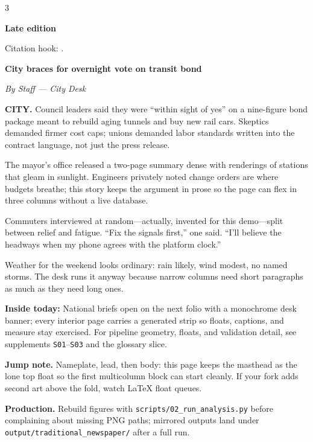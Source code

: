 \documentclass[
]{article}
\begin{document}
\begin{multicols}{3}

\textbf{Late edition}

\noindent Citation hook: \cite{template2026gazette}.
\par\smallskip

\noindent\textbf{\Large City braces for overnight vote on transit bond}\par\smallskip
\textit{By Staff — City Desk}\par\smallskip

\textbf{CITY.} Council leaders said they were ``within sight of yes'' on
a nine-figure bond package meant to rebuild aging tunnels and buy new
rail cars. Skeptics demanded firmer cost caps; unions demanded labor
standards written into the contract language, not just the press
release.

The mayor's office released a two-page summary dense with renderings of
stations that gleam in sunlight. Engineers privately noted change orders
are where budgets breathe; this story keeps the argument in prose so the
page can flex in three columns without a live database.

Commuters interviewed at random---actually, invented for this
demo---split between relief and fatigue. ``Fix the signals first,'' one
said. ``I'll believe the headways when my phone agrees with the platform
clock.''

Weather for the weekend looks ordinary: rain likely, wind modest, no
named storms. The desk runs it anyway because narrow columns need short
paragraphs as much as they need long ones.

\textbf{Inside today:} National briefs open on the next folio with a
monochrome desk banner; every interior page carries a generated strip so
floats, captions, and measure stay exercised. For pipeline geometry,
floats, and validation detail, see supplements
\texttt{S01}--\texttt{S03} and the glossary slice.

\textbf{Jump note.} Nameplate, lead, then body: this page keeps the
masthead as the lone top float so the first multicolumn block can start
cleanly. If your fork adds second art above the fold, watch LaTeX float
queues.

\textbf{Production.} Rebuild figures with
\texttt{scripts/02\_run\_analysis.py} before complaining about missing
PNG paths; mirrored outputs land under
\texttt{output/traditional\_newspaper/} after a full run.

\end{multicols}
\end{document}
